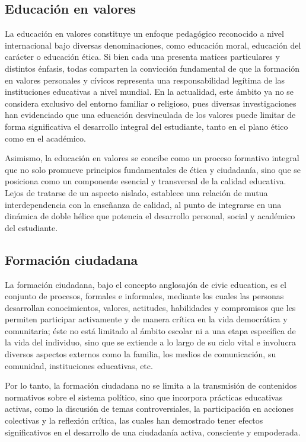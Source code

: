 \subsection{Educación en valores}
La educación en valores constituye un enfoque pedagógico reconocido a nivel
internacional bajo diversas denominaciones, como educación moral, educación del
carácter o educación ética. Si bien cada una presenta matices particulares y
distintos énfasis, todas comparten la convicción fundamental de que la
formación en valores personales y cívicos representa una responsabilidad
legítima de las instituciones educativas a nivel mundial. En la actualidad,
este ámbito ya no se considera exclusivo del entorno familiar o religioso, pues
diversas investigaciones han evidenciado que una educación desvinculada de los
valores puede limitar de forma significativa el desarrollo integral del
estudiante, tanto en el plano ético como en el académico.\cite{lovat2009values}

Asimismo, la educación en valores se concibe como un proceso formativo integral
que no solo promueve principios fundamentales de ética y ciudadanía, sino que
se posiciona como un componente esencial y transversal de la calidad educativa.
Lejos de tratarse de un aspecto aislado, establece una relación de mutua
interdependencia con la enseñanza de calidad, al punto de integrarse en una
dinámica de doble hélice que potencia el desarrollo personal, social y
académico del estudiante. \cite{lovat2009values}

\subsection{Formación ciudadana}
La formación ciudadana, bajo el concepto anglosajón de civic education, es el
conjunto de procesos, formales e informales, mediante los cuales las personas
desarrollan conocimientos, valores, actitudes, habilidades y compromisos que
les permiten participar activamente y de manera crítica en la vida democrática
y comunitaria; éste no está limitado al ámbito escolar ni a una etapa
específica de la vida del individuo, sino que se extiende a lo largo de su
ciclo vital e involucra diversos aspectos externos como la familia, los medios
de comunicación, su comunidad, instituciones educativas, etc.
\cite{crittenden2007civic}

Por lo tanto, la formación ciudadana no se limita a la transmisión de
contenidos normativos sobre el sistema político, sino que incorpora prácticas
educativas activas, como la discusión de temas controversiales, la
participación en acciones colectivas y la reflexión crítica, las cuales han
demostrado tener efectos significativos en el desarrollo de una ciudadanía
activa, consciente y empoderada. \cite{crittenden2007civic}

